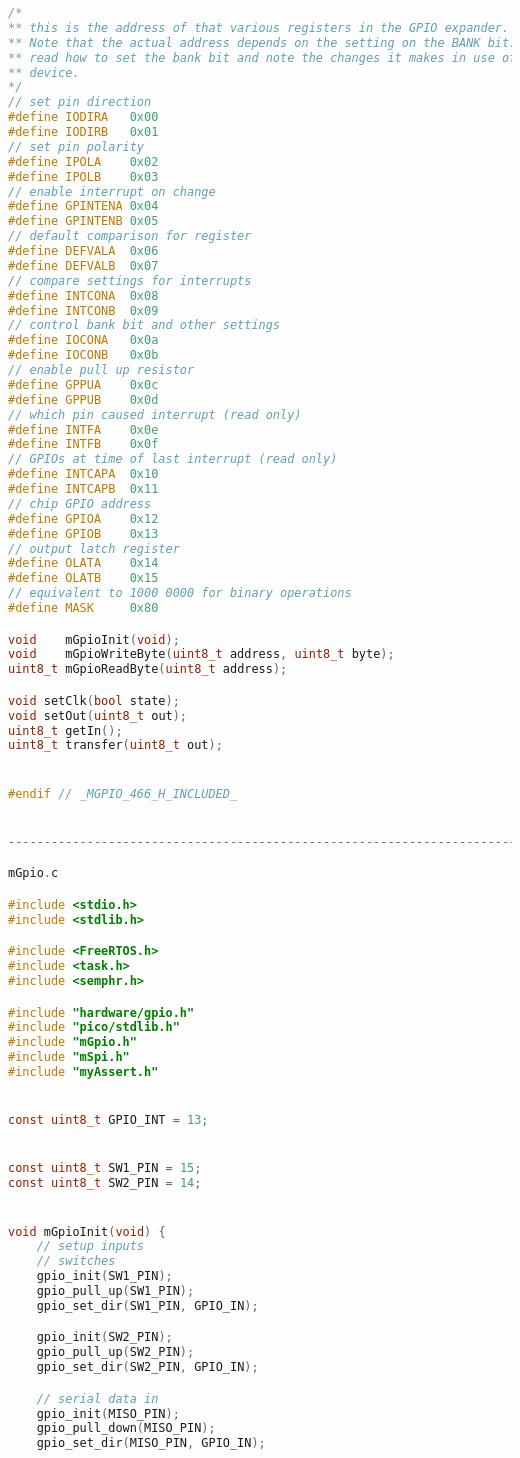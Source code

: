 \documentclass[sigconf]{article}
\begin{document}
\begin{lstlisting}[basicstyle=\footnotesize\ttfamily, language=c,breaklines]
/*
** this is the address of that various registers in the GPIO expander.
** Note that the actual address depends on the setting on the BANK bit.
** read how to set the bank bit and note the changes it makes in use of
** device.
*/
// set pin direction
#define IODIRA   0x00
#define IODIRB   0x01
// set pin polarity
#define IPOLA    0x02
#define IPOLB    0x03
// enable interrupt on change
#define GPINTENA 0x04
#define GPINTENB 0x05
// default comparison for register
#define DEFVALA  0x06
#define DEFVALB  0x07
// compare settings for interrupts
#define INTCONA  0x08
#define INTCONB  0x09
// control bank bit and other settings
#define IOCONA   0x0a
#define IOCONB   0x0b
// enable pull up resistor
#define GPPUA    0x0c
#define GPPUB    0x0d
// which pin caused interrupt (read only)
#define INTFA    0x0e
#define INTFB    0x0f
// GPIOs at time of last interrupt (read only)
#define INTCAPA  0x10
#define INTCAPB  0x11
// chip GPIO address
#define GPIOA    0x12
#define GPIOB    0x13
// output latch register
#define OLATA    0x14
#define OLATB    0x15
// equivalent to 1000 0000 for binary operations
#define MASK     0x80

void    mGpioInit(void);
void    mGpioWriteByte(uint8_t address, uint8_t byte);
uint8_t mGpioReadByte(uint8_t address);

void setClk(bool state);
void setOut(uint8_t out);
uint8_t getIn();
uint8_t transfer(uint8_t out);


#endif // _MGPIO_466_H_INCLUDED_


--------------------------------------------------------------------------------

mGpio.c

#include <stdio.h>
#include <stdlib.h>

#include <FreeRTOS.h>
#include <task.h>
#include <semphr.h>

#include "hardware/gpio.h"
#include "pico/stdlib.h"
#include "mGpio.h"
#include "mSpi.h"
#include "myAssert.h"


const uint8_t GPIO_INT = 13;


const uint8_t SW1_PIN = 15;
const uint8_t SW2_PIN = 14;


void mGpioInit(void) {
    // setup inputs
    // switches
    gpio_init(SW1_PIN);
    gpio_pull_up(SW1_PIN);
    gpio_set_dir(SW1_PIN, GPIO_IN);

    gpio_init(SW2_PIN);
    gpio_pull_up(SW2_PIN);
    gpio_set_dir(SW2_PIN, GPIO_IN);

    // serial data in
    gpio_init(MISO_PIN);
    gpio_pull_down(MISO_PIN);
    gpio_set_dir(MISO_PIN, GPIO_IN);


\end{lstlisting}
\end{document}
